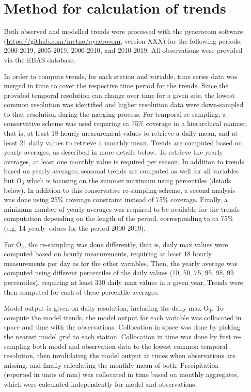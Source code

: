 \section{\label{Method}{Method for calculation of trends}}
Both observed and modelled trends were processed with the pyaerocom software (\url{https://github.com/metno/pyaerocom}, version XXX) for the following periods: 2000-2019, 2005-2019, 2000-2010, and 2010-2019. All observations were provided via the EBAS database. 

In order to compute trends, for each station and variable, time series data was merged in time to cover the respective time period for the trends.
Since the provided temporal resolution can change over time for a given site, the lowest common resolution was identified and higher resolution data were down-sampled to that resolution during the merging process. For temporal re-sampling, a conservative scheme was used requiring ca 75\% coverage in a hierarchical manner, that is, at least 18 hourly measurement values to retrieve a daily mean, and at least 21 daily values to retrieve a monthly mean. Trends are computed based on yearly averages, as described in more details below. To retrieve the yearly averages, at least one monthly value is required per season. In addition to trends based on yearly averages, seasonal trends are computed as well for all variables but O$_{3}$ which is focusing on the summer maximum using percentiles (details below). In addition to this conservative re-sampling scheme, a second analysis was done using 25\% coverage constraint instead of 75\% coverage. Finally, a minimum number of yearly averages was required to be available for the trends computation depending on the length of the period, corresponding to ca 75\% (e.g. 14 yearly values for the period 2000-2019).

For O$_3$, the re-sampling was done differently, that is, daily max values were computed based on hourly measurements, requiring at least 18 hourly measurements per day as for the other variables. Then, the yearly average was computed using different percentiles of the daily values (10, 50, 75, 95, 98, 99 percentiles), requiring at least 330 daily max values in a given year. Trends were then computed for each of these percentile averages.

Model output is given on daily resolution, including the daily max O$_3$. To compute the model trends, the model output for each variable was collocated in space and time with the observations. Collocation in space was done by picking the nearest model grid to each station. Collocation in time was done by first re-sampling both model and observation data to the lowest common temporal resolution, then invalidating the model output at times when observations are missing, and finally calculating the monthly mean of both. Precipitation (reported in units of mm) was collocated in time based on monthly aggregates, which were calculated independently for model and observations.

